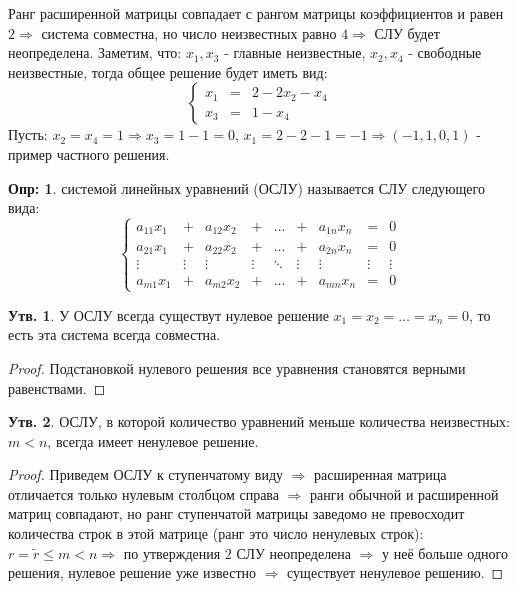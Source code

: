 \documentclass[12pt]{article}
\theoremstyle{definition}
\newtheorem{defn}{Опр:}
\newtheorem{prop}{Утв.}
\newcommand{\wte}[1]{\widetilde{#1}}
\begin{document}
Ранг расширенной матрицы совпадает с рангом матрицы коэффициентов и равен $2 \Rightarrow$ система совместна, но число неизвестных равно $4 \Rightarrow$ СЛУ будет неопределена. Заметим, что: $x_1, x_3$ - главные неизвестные, $x_2, x_4$ - свободные неизвестные, тогда общее решение будет иметь вид:
$$
	\left\{
	\begin{array}{ccc}
		x_1 &=& 2 - 2x_2 - x_4\\
		x_3 &=& 1 - x_4
	\end{array}
	\right.	
$$
Пусть: $x_2 = x_4 = 1 \Rightarrow x_3 = 1 - 1 = 0, \, x_1 = 2 - 2 - 1 = -1 \Rightarrow  (-1,1,0,1)$ - пример частного решения.

\begin{defn}
	 системой линейных уравнений (ОСЛУ) называется СЛУ следующего вида:
	$$
		\left\{
		\begin{array}{ccccccccc}
			a_{11} x_1 & +& a_{12}x_2 &+& \dotsc &+& a_{1n} x_n  & = & 0 \\
			a_{21} x_1 &+& a_{22}x_2 &+& \dotsc &+& a_{2n} x_n & = & 0\\
			\vdots & \vdots & \vdots & \vdots & \ddots & \vdots &\vdots & \vdots & \vdots  \\
			a_{m1}x_1 &+& a_{m2}x_2 &+& \dotsc &+&  a_{mn}x_n & = & 0
		\end{array}
		\right.
	$$
\end{defn}
\begin{prop}
	У ОСЛУ всегда существут нулевое решение $x_1 = x_2 = \dotsc = x_n = 0$, то есть эта система всегда совместна.
\end{prop}
\begin{proof}
	Подстановкой нулевого решения все уравнения становятся верными равенствами.
\end{proof}

\begin{prop}
	ОСЛУ, в которой количество уравнений меньше количества неизвестных: $m < n$, всегда имеет ненулевое решение.
\end{prop}
\begin{proof}
	Приведем ОСЛУ к ступенчатому виду $\Rightarrow$ расширенная матрица отличается только нулевым столбцом справа $\Rightarrow$ ранги обычной и расширенной матриц совпадают, но ранг ступенчатой матрицы заведомо не превосходит количества строк в этой матрице (ранг это число ненулевых строк): $r = \wte{r} \leq m < n \Rightarrow$ по утверждения $2$ СЛУ неопределена $\Rightarrow$ у неё больше одного решения, нулевое решение уже известно $\Rightarrow$ существует ненулевое решению. 
\end{proof}
\end{document}
